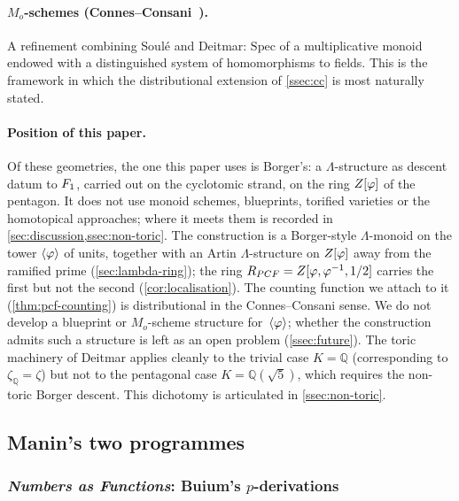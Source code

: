 \paragraph{$M_o$-schemes
(Connes--Consani~\cite{connesconsani10}).}
A refinement combining Soul\'e and Deitmar:
$\mathrm{Spec}$ of a multiplicative monoid endowed with a
distinguished system of homomorphisms to fields.  This is the
framework in which the distributional extension of
\cref{ssec:cc} is most naturally stated.

\paragraph{Position of this paper.}
Of these geometries, the one this paper uses is Borger's: a $\Lambda$-structure as
descent datum to $F_1$, carried out on the cyclotomic strand, on the ring $Z[\varphi]$ of
the pentagon.  It does not use monoid schemes, blueprints, torified varieties or the
homotopical approaches; where it meets them is recorded in
\cref{sec:discussion,ssec:non-toric}.
The construction is a Borger-style $\Lambda$-monoid on the tower
$\langle\varphi\rangle$ of units, together with an Artin $\Lambda$-structure on
$Z[\varphi]$ away from the ramified prime (\cref{sec:lambda-ring}); the ring
$R_{PCF}=Z[\varphi,\varphi^{-1},1/2]$ carries the first but not the
second (\cref{cor:localisation}).  The
counting function we attach to it
\textup{(\cref{thm:pcf-counting})} is distributional in the
Connes--Consani sense.  We do not develop a blueprint or
$M_o$-scheme structure for~$\langle\varphi\rangle$; whether the
construction admits such a structure is left as an open problem
\textup{(\cref{ssec:future})}.  The toric machinery of
Deitmar applies cleanly to the trivial case $K=\mathbb{Q}$
\textup{(}corresponding to $\zeta_\mathbb{Q}=\zeta$\textup{)} but
not to the pentagonal case $K=\mathbb{Q}(\sqrt{5})$, which
requires the non-toric Borger descent.  This dichotomy is
articulated in \cref{ssec:non-toric}.




\subsection{Manin's two programmes}\label{sec:manin}

\subsubsection{\emph{Numbers as Functions}: Buium's $p$-derivations}

